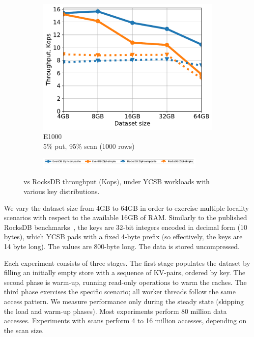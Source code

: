 \begin{figure}[tb]
\begin{subfigure}{0.33\linewidth}
\includegraphics[width=\textwidth]{figs/Workload_E+_line.pdf}
\caption{E1000 \\5\% put, 95\% scan (1000 rows)}
\label{fig:throughput:e1000}
\end{subfigure}
\begin{subfigure}{\linewidth}
\centerline{
\includegraphics[width=0.9\textwidth]{figs/legend.pdf}
\vspace{-5mm}
}
\end{subfigure}
\caption{
{\sys\/ vs RocksDB throughput (Kops), under YCSB workloads with various key distributions.}
}
\label{fig:throughput}
\end{figure}

We vary the dataset size from 4GB to 64GB in order to exercise multiple locality 
scenarios with respect to the available 16GB of RAM. Similarly to the published RocksDB benchmarks~\cite{RocksDBPerf}, 
the keys are 32-bit integers encoded in decimal form (10 bytes), which YCSB pads with a fixed 4-byte prefix (so effectively, 
the keys are 14 byte long). The values are 800-byte long. The data is stored uncompressed. 


Each experiment consists of three stages. The first stage populates the dataset by filling an initially empty store 
with a sequence of KV-pairs, ordered by key. 
The second phase is warm-up, running read-only operations to warm the caches. The third
phase exercises the specific scenario; all worker threads follow the same access pattern. We 
measure performance only during the steady state (skipping the load and warm-up phases). 
Most experiments  perform 80 million data accesses. Experiments with scans perform 4 to 16 million 
accesses, depending on the scan size. 

